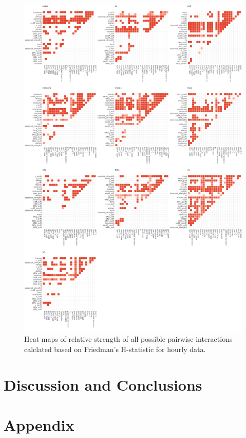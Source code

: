 \documentclass[11pt,a4paper,]{article}
\theoremstyle{definition}
\theoremstyle{definition}
\theoremstyle{definition}
\theoremstyle{remark}
\begin{document}
\begin{figure}
\centering
\includegraphics{figures/friedmanhourly-1.png}
\caption{\label{fig:friedmanhourly}Heat maps of relative strength of all
possible pairwise interactions calclated based on Friedman's H-statistic
for hourly data.}
\end{figure}

\section{Discussion and Conclusions}\label{conclusions}

\newpage

\section*{Appendix}\label{appendix}
\end{document}
